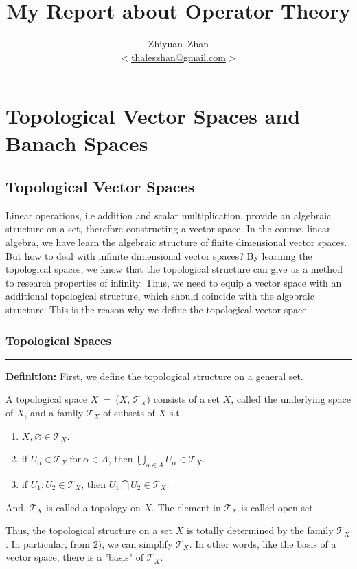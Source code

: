 \documentclass[a4paper,11pt]{report}
\title{My Report about Operator Theory}
\author{Zhiyuan~Zhan\\ $<$\href{mailto:thaleszhan@gmail.com}%
            {thaleszhan@gmail.com}$>$}
\begin{document}
\maketitle
\tableofcontents
\chapter{Topological Vector Spaces and Banach Spaces}

\section{Topological Vector Spaces}
Linear operations, i.e addition and scalar multiplication, provide an algebraic structure on a set, therefore constructing a vector space. In the course, linear algebra, we have learn the algebraic structure of finite dimensional vector spaces. But how to deal with infinite dimensional vector spaces? By learning the topological spaces, we know that the topological structure can give us a method to research properties of infinity. Thus, we need to equip a vector space with an additional topological structure, which should coincide with the algebraic structure. This is the reason why we define the topological vector space.

\subsection{Topological Spaces}
\rule{1mm}{1mm} \textbf{Definition:} First, we define the topological structure on a general set.
\begin{defn}
A topological space $X$~=~($X$, $\mathscr{T}_X$) consists of a set $X$, called the underlying space of $X$, and a family $\mathscr{T}_X$ of subsets of $X$ s.t.
	\begin{enumerate}[label=\arabic*)]
		\item $X, \varnothing \in \mathscr{T}_X$.
		\item if $U_\alpha \in \mathscr{T}_X \ \text{for} \ \alpha \in A$, then $\bigcup_{\alpha \in A}U_\alpha \in \mathscr{T}_X$.
		\item if $U_1, U_2 \in \mathscr{T}_X$, then $U_1 \bigcap U_2 \in \mathscr{T}_X$.
	\end{enumerate}
And, $\mathscr{T}_X$ is called a topology on $X$. The element in $\mathscr{T}_X$ is called open set.
\end{defn}

Thus, the topological structure on a set $X$ is totally determined by the family $\mathscr{T}_X$. In particular, from $2)$, we can simplify $\mathscr{T}_X$. In other words, like the basis of a vector space, there is a "basis" of $\mathscr{T}_X$.
\end{document}

